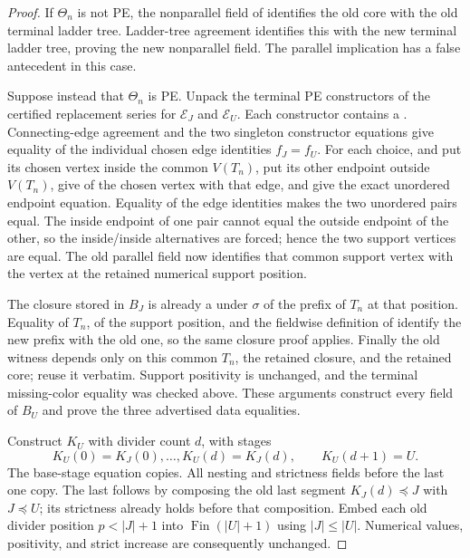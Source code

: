 \begin{proof}
If $\Theta_n$ is not PE, the nonparallel field of
 identifies the old core with the old terminal
ladder tree.  Ladder-tree agreement identifies this with the new terminal
ladder tree, proving the new nonparallel field.  The parallel implication
has a false antecedent in this case.

Suppose instead that $\Theta_n$ is PE.  Unpack the terminal PE constructors
of the certified replacement series for $\mathcal E_J$ and
$\mathcal E_U$.  Each constructor contains a
.  Connecting-edge agreement and the two
singleton constructor equations give equality of the individual chosen
edge identities $f_J=f_U$.  For each choice,
 and  put its
chosen vertex inside the common $V(T_n)$, put its other endpoint outside
$V(T_n)$, give  of the chosen vertex with that edge, and
give the exact unordered endpoint equation.  Equality of the edge
identities makes the two unordered pairs equal.  The inside endpoint of
one pair cannot equal the outside endpoint of the other, so the
inside/inside alternatives are forced; hence the two support vertices are
equal.  The old parallel field now identifies that common support vertex
with the vertex at the retained numerical support position.

The closure stored in $B_J$ is already a
 under $\sigma$ of the prefix of $T_n$ at that
position.  Equality of $T_n$, of the support position, and the fieldwise
definition of  identify the new prefix with
the old one, so the same closure proof applies.  Finally the old
 witness depends only on this common $T_n$, the
retained closure, and the retained core; reuse it verbatim.  Support
positivity is unchanged, and the terminal missing-color equality was
checked above.  These arguments construct every field of $B_U$ and prove
the three advertised data equalities.

Construct $K_U$ with divider count $d$, with stages
\[
 K_U(0)=K_J(0),\ldots,K_U(d)=K_J(d),\qquad K_U(d+1)=U.
                                                               \tag{5}
\]
The base-stage equation copies.  All nesting and strictness fields before
the last one copy.  The last follows by composing the old last segment
$K_J(d)\preccurlyeq J$ with $J\preccurlyeq U$; its strictness already
holds before that composition.  Embed each old divider position
$p<|J|+1$ into $\operatorname{Fin}(|U|+1)$ using $|J|\leq|U|$.  Numerical
values, positivity, and strict increase are consequently unchanged.


\end{proof}
